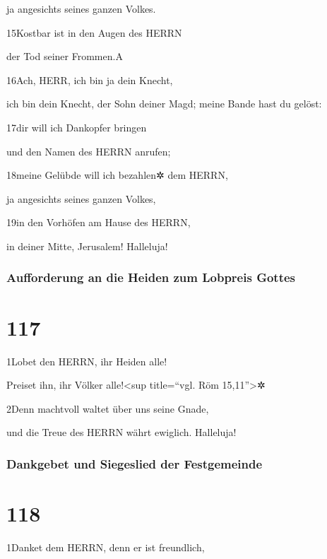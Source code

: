 ja angesichts seines ganzen Volkes.

15Kostbar ist in den Augen des HERRN

der Tod seiner Frommen.{A}

16Ach, HERR, ich bin ja dein Knecht,

ich bin dein Knecht, der Sohn deiner Magd; meine Bande hast du gelöst:

17dir will ich Dankopfer bringen

und den Namen des HERRN anrufen;

18meine Gelübde will ich bezahlen✲ dem HERRN,

ja angesichts seines ganzen Volkes,

19in den Vorhöfen am Hause des HERRN,

in deiner Mitte, Jerusalem! Halleluja!

\hypertarget{aufforderung-an-die-heiden-zum-lobpreis-gottes}{%
\subsubsection{Aufforderung an die Heiden zum Lobpreis
Gottes}\label{aufforderung-an-die-heiden-zum-lobpreis-gottes}}

\hypertarget{section-116}{%
\section{117}\label{section-116}}

1Lobet den HERRN, ihr Heiden alle!

Preiset ihn, ihr Völker alle!\textless sup title=``vgl. Röm
15,11''\textgreater✲

2Denn machtvoll waltet über uns seine Gnade,

und die Treue des HERRN währt ewiglich. Halleluja!

\hypertarget{dankgebet-und-siegeslied-der-festgemeinde}{%
\subsubsection{Dankgebet und Siegeslied der
Festgemeinde}\label{dankgebet-und-siegeslied-der-festgemeinde}}

\hypertarget{section-117}{%
\section{118}\label{section-117}}

1Danket dem HERRN, denn er ist freundlich,

